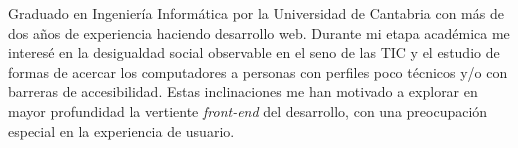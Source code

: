 \documentclass[9pt]{developercv} %
\begin{document}
\begin{minipage}[t]{0.45\textwidth} %
	\vspace{-\baselineskip} %
	
	Graduado en Ingeniería Informática por la Universidad de Cantabria con más de dos años de experiencia haciendo desarrollo web. Durante mi etapa académica me interesé en la desigualdad social observable en el seno de las TIC y el estudio de formas de acercar los computadores a personas con perfiles poco técnicos y/o con barreras de accesibilidad. Estas inclinaciones me han motivado a explorar en mayor profundidad la vertiente \emph{front-end} del desarrollo, con una preocupación especial en la experiencia de usuario.\\
\end{minipage}
\hfill %
\begin{minipage}[t]{0.5\textwidth} %
	\vspace{-\baselineskip} %
	\begin{barchart}{5.5}
	\end{barchart}
\end{minipage}



\end{document}
